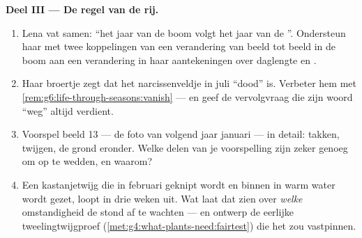 \begin{problem}
\medskip\noindent\textbf{Deel III --- De regel van de rij.}
\begin{enumerate}[resume]
  \item Lena vat samen: ``het jaar van de boom volgt het jaar van de
        ''. Ondersteun haar met twee koppelingen van een
        verandering van beeld tot beeld in de boom aan een verandering
        in haar aantekeningen over daglengte en .
  \item Haar broertje zegt dat het narcissenveldje in juli ``dood'' is.
        Verbeter hem met
        \cref{rem:g6:life-through-seasons:vanish} --- en geef de
        vervolgvraag die zijn woord ``weg'' altijd verdient.
  \item Voorspel beeld 13 --- de foto van volgend jaar januari --- in
        detail: takken, twijgen, de grond eronder. Welke delen van je
        voorspelling zijn zeker genoeg om op te wedden, en waarom?
  \item Een kastanjetwijg die in februari geknipt wordt en binnen in
        warm water wordt gezet, loopt in drie weken uit. Wat laat dat
        zien over \emph{welke} omstandigheid de  stond af te
        wachten --- en ontwerp de eerlijke tweelingtwijgproef
        (\cref{met:g4:what-plants-need:fairtest}) die het zou vastpinnen.
\end{enumerate}
\end{problem}
